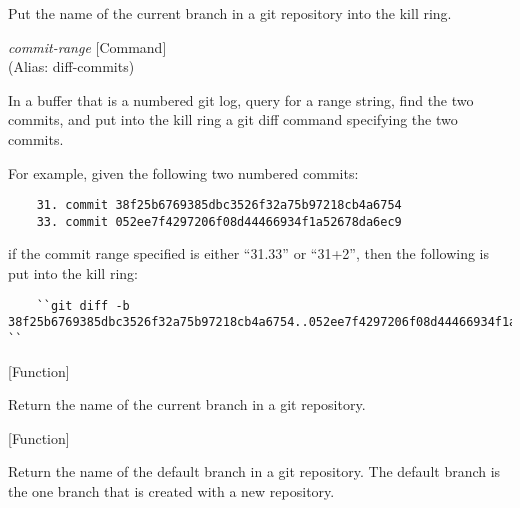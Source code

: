 \begin{doc-string}
Put the name of the current branch in a git repository into the kill ring.
\end{doc-string}

\vspace{1em}
\noindent
{}
\usebox{\funcname}\emph{commit-range}
 \hfill [Command]\\%
 (Alias: diff-commits)

\begin{doc-string}
In a buffer that is a numbered git log, query for a range string, find the two
commits, and put into the kill ring a git diff command specifying the two commits.

For example, given the following two numbered commits:

\small{\begin{verbatim}
    31. commit 38f25b6769385dbc3526f32a75b97218cb4a6754
    33. commit 052ee7f4297206f08d44466934f1a52678da6ec9
\end{verbatim}}

if the commit range specified is either ``31.33'' or ``31+2'', then the following
is put into the kill ring:

\small{\begin{verbatim}
    ``git diff -b 38f25b6769385dbc3526f32a75b97218cb4a6754..052ee7f4297206f08d44466934f1a52678da6ec9 ``
\end{verbatim}}
\end{doc-string}

\vspace{1em}
\noindent
{}
\usebox{\funcname}
 \hfill [Function]

\begin{doc-string}
Return the name of the current branch in a git repository.
\end{doc-string}

\vspace{1em}
\noindent
{}
\usebox{\funcname}
 \hfill [Function]

\begin{doc-string}
Return the name of the default branch in a git repository.  The default
branch is the one branch that is created with a new repository.
\end{doc-string}

